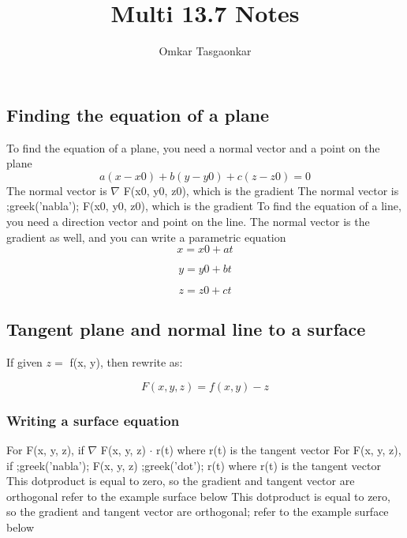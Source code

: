 \documentclass{article}
\title{Multi 13.7 Notes}
\author{Omkar Tasgaonkar}
\begin{document}
\maketitle
\tableofcontents
\listoffigures
\pagebreak

\subsection{Finding the equation of a plane}
To find the equation of a plane, you need a normal vector and a point on the plane\\

\begin{equation}
a(x - x0) + b(y - y0) + c(z-z0) = 0
\end{equation}
The normal vector is $\nabla$ F(x0, y0, z0), which is the gradient
The normal vector is ;greek('nabla'); F(x0, y0, z0), which is the gradient
To find the equation of a line, you need a direction vector and point on the line. The normal vector is the gradient as well, and you can write a parametric equation\\

\begin{equation}
x = x0 + at
\end{equation}

\begin{equation}
y = y0 + bt
\end{equation}

\begin{equation}
z = z0 + ct
\end{equation}

\subsection{Tangent plane and normal line to a surface}
If given $z =$ f(x, y), then rewrite as: 

\begin{equation}
F(x, y, z) = f(x, y) - z
\end{equation}

\subsubsection{Writing a surface equation}
For F(x, y, z), if $\nabla$ F(x, y, z) $\cdot$ r(t) where r(t) is the tangent vector
For F(x, y, z), if ;greek('nabla'); F(x, y, z) ;greek('dot'); r(t) where r(t) is the tangent vector
This dotproduct is equal to zero, so the gradient and tangent vector are orthogonal refer to the example surface below
This dotproduct is equal to zero, so the gradient and tangent vector are orthogonal; refer to the example surface below
\end{document}
